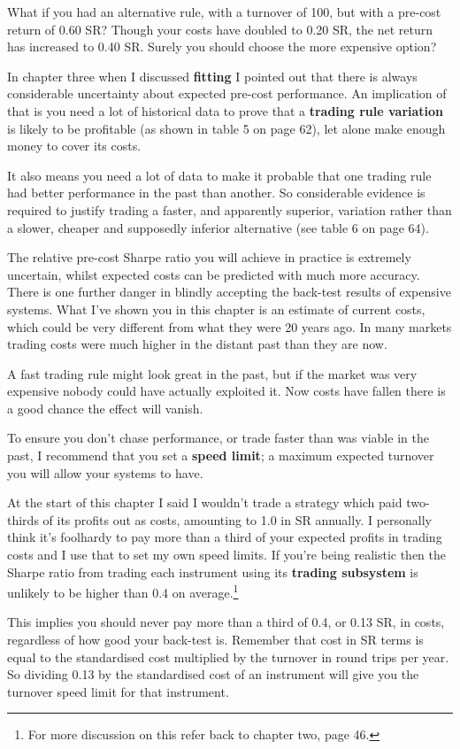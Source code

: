 What if you had an alternative rule, with a turnover of 100, but with a pre-cost return of 0.60 SR? Though your costs have doubled to 0.20 SR, the net return has increased to 0.40 SR. Surely you should choose the more expensive option?

In chapter three when I discussed \textbf{fitting} I pointed out that there is always considerable uncertainty about expected pre-cost performance. An implication of that is you need a lot of historical data to prove that a \textbf{trading rule variation} is likely to be profitable (as shown in table 5 on page 62), let alone make enough money to cover its costs.

It also means you need a lot of data to make it probable that one trading rule had better performance in the past than another. So considerable evidence is required to justify trading a faster, and apparently superior, variation rather than a slower, cheaper and supposedly inferior alternative (see table 6 on page 64).

The relative pre-cost Sharpe ratio you will achieve in practice is extremely uncertain, whilst expected costs can be predicted with much more accuracy. There is one further danger in blindly accepting the back-test results of expensive systems. What I've shown you in this chapter is an estimate of current costs, which could be very different from what they were 20 years ago. In many markets trading costs were much higher in the distant past than they are now.

A fast trading rule might look great in the past, but if the market was very expensive nobody could have actually exploited it. Now costs have fallen there is a good chance the effect will vanish.

To ensure you don't chase performance, or trade faster than was viable in the past, I recommend that you set a \textbf{speed limit}; a maximum expected turnover you will allow your systems to have.

At the start of this chapter I said I wouldn't trade a strategy which paid two-thirds of its profits out as costs, amounting to 1.0 in SR annually. I personally think it's foolhardy to pay more than a third of your expected profits in trading costs and I use that to set my own speed limits. If you're being realistic then the Sharpe ratio from trading each instrument using its \textbf{trading subsystem} is unlikely to be higher than 0.4 on average.\footnote{For more discussion on this refer back to chapter two, page 46.}

This implies you should never pay more than a third of 0.4, or 0.13 SR, in costs, regardless of how good your back-test is. Remember that cost in SR terms is equal to the standardised cost multiplied by the turnover in round trips per year. So dividing 0.13 by the standardised cost of an instrument will give you the turnover speed limit for that instrument.

